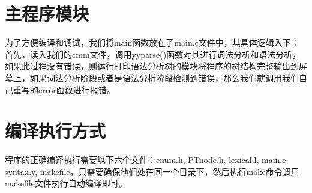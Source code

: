 \documentclass[lang=cn,11pt,a4paper,cite=authoryear]{elegantpaper}
\begin{document}
\section{主程序模块}
为了方便编译和调试，我们将main函数放在了main.c文件中，其具体逻辑入下：首先，读入我们的cmm文件，调用yyparse()函数对其进行词法分析和语法分析，如果此过程没有错误，则运行打印语法分析树的模块将程序的树结构完整输出到屏幕上，如果词法分析阶段或者是语法分析阶段检测到错误，那么我们就调用我们自己重写的error函数进行报错。
\section{编译执行方式}
程序的正确编译执行需要以下六个文件：enum.h, PTnode.h, lexical.l, main.c, syntax.y, makefile，只需要确保他们处在同一个目录下，然后执行make命令调用makefile文件执行自动编译即可。
\end{document}
